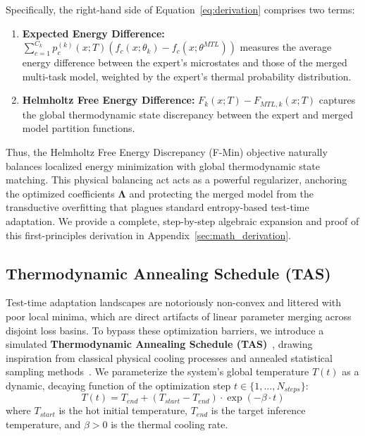 Specifically, the right-hand side of Equation~\eqref{eq:derivation} comprises two terms:
\begin{enumerate}
    \item \textbf{Expected Energy Difference:} $\sum_{c=1}^{C_k} p_c^{(k)}(x; T) \left( f_c(x; \theta_k) - f_c(x; \theta^{MTL}) \right)$ measures the average energy difference between the expert's microstates and those of the merged multi-task model, weighted by the expert's thermal probability distribution.
    \item \textbf{Helmholtz Free Energy Difference:} $F_k(x; T) - F_{MTL, k}(x; T)$ captures the global thermodynamic state discrepancy between the expert and merged model partition functions.
\end{enumerate}

Thus, the Helmholtz Free Energy Discrepancy (F-Min) objective naturally balances localized energy minimization with global thermodynamic state matching. This physical balancing act acts as a powerful regularizer, anchoring the optimized coefficients $\boldsymbol{\Lambda}$ and protecting the merged model from the transductive overfitting that plagues standard entropy-based test-time adaptation. We provide a complete, step-by-step algebraic expansion and proof of this first-principles derivation in Appendix~\ref{sec:math_derivation}.

\subsection{Thermodynamic Annealing Schedule (TAS)}
Test-time adaptation landscapes are notoriously non-convex and littered with poor local minima, which are direct artifacts of linear parameter merging across disjoint loss basins. To bypass these optimization barriers, we introduce a simulated \textbf{Thermodynamic Annealing Schedule (TAS)}~\cite{kirkpatrick1983optimization}, drawing inspiration from classical physical cooling processes and annealed statistical sampling methods~\cite{neal2001annealed}. We parameterize the system's global temperature $T(t)$ as a dynamic, decaying function of the optimization step $t \in \{1, \dots, N_{steps}\}$:
\begin{equation}
\label{eq:annealing}
T(t) = T_{end} + \left( T_{start} - T_{end} \right) \cdot \exp\left( -\beta \cdot t \right)
\end{equation}
where $T_{start}$ is the hot initial temperature, $T_{end}$ is the target inference temperature, and $\beta > 0$ is the thermal cooling rate.


